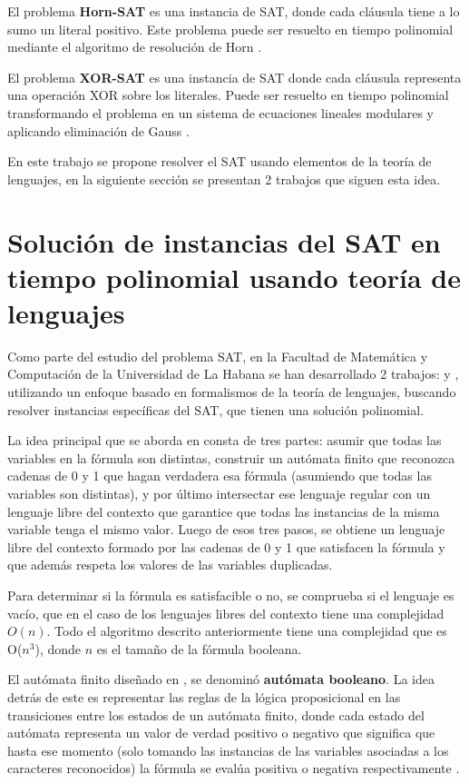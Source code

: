 \documentclass[12pt]{article}
\begin{document}
El problema \textbf{Horn-SAT} es una instancia de SAT, donde cada cláusula tiene a lo sumo un literal positivo.  Este problema puede ser resuelto en tiempo polinomial mediante el algoritmo de resolución de Horn \cite{hornsatbib}.

El problema \textbf{XOR-SAT} es una instancia de SAT donde cada cláusula representa una operación XOR sobre los literales. Puede ser resuelto en tiempo polinomial transformando el problema en un sistema de ecuaciones lineales modulares y aplicando eliminación de Gauss \cite{xorsatbib}.

En este trabajo se propone resolver el SAT usando elementos de la teoría de lenguajes, en la siguiente sección se 
presentan 2 trabajos que siguen esta idea.

\section{Solución de instancias del SAT en tiempo polinomial usando teoría de lenguajes}

Como parte del estudio del problema SAT, en la Facultad de Matemática y Computación de la Universidad de La Habana
se han desarrollado 2 trabajos: \cite{aCFSAT} y \cite{aSRCSAT}, utilizando un enfoque basado en formalismos de la teoría de lenguajes, buscando resolver 
instancias específicas del SAT, que tienen una solución polinomial.

La idea principal que se aborda en \cite{aCFSAT} consta de tres partes: asumir que todas las variables en la fórmula son distintas, construir un autómata finito que reconozca cadenas de 0 y 1 que hagan verdadera esa fórmula (asumiendo que todas las variables son distintas), y por último intersectar ese lenguaje regular con un lenguaje libre del contexto que garantice que todas las instancias de la misma variable tenga el mismo valor. Luego de esos tres pasos, se obtiene un lenguaje libre del contexto formado por las cadenas de 0 y 1 que satisfacen la fórmula y que además respeta los valores de las variables duplicadas.

Para determinar si la fórmula es satisfacible o no, se comprueba si el lenguaje es vacío, que en el caso de los lenguajes libres del contexto tiene una complejidad $O(n)$. Todo el algoritmo descrito anteriormente tiene una complejidad que es O($n^3$), donde $n$ es el tamaño de la fórmula booleana.

El autómata finito diseñado en \cite{aCFSAT}, se denominó \textbf{autómata booleano}. La idea detrás de este es representar las reglas de la lógica proposicional en las transiciones entre los estados de un autómata finito, donde cada estado del autómata representa un valor de verdad positivo o negativo que significa que hasta ese momento (solo tomando las instancias de las variables asociadas a los caracteres reconocidos) la fórmula se evalúa positiva o negativa respectivamente \cite{aCFSAT}.
\end{document}
